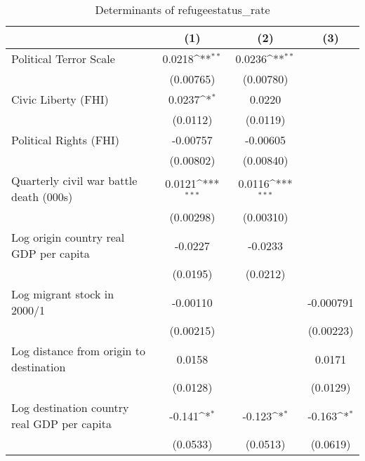 \begin{table}[htbp]\centering
\def\sym#1{\ifmmode^{#1}\else\(^{#1}\)\fi}
\caption{Determinants of refugeestatus\_rate}
\begin{tabular}{l*{3}{c}}
\hline\hline
                    &\multicolumn{1}{c}{(1)}         &\multicolumn{1}{c}{(2)}         &\multicolumn{1}{c}{(3)}         \\
\hline
Political Terror Scale&      0.0218\sym{**} &      0.0236\sym{**} &                     \\
                    &   (0.00765)         &   (0.00780)         &                     \\
[1em]
Civic Liberty (FHI) &      0.0237\sym{*}  &      0.0220         &                     \\
                    &    (0.0112)         &    (0.0119)         &                     \\
[1em]
Political Rights (FHI)&    -0.00757         &    -0.00605         &                     \\
                    &   (0.00802)         &   (0.00840)         &                     \\
[1em]
Quarterly civil war battle death (000s)&      0.0121\sym{***}&      0.0116\sym{***}&                     \\
                    &   (0.00298)         &   (0.00310)         &                     \\
[1em]
Log origin country real GDP per capita&     -0.0227         &     -0.0233         &                     \\
                    &    (0.0195)         &    (0.0212)         &                     \\
[1em]
Log migrant stock in 2000/1&    -0.00110         &                     &   -0.000791         \\
                    &   (0.00215)         &                     &   (0.00223)         \\
[1em]
Log distance from origin to destination&      0.0158         &                     &      0.0171         \\
                    &    (0.0128)         &                     &    (0.0129)         \\
[1em]
Log destination country real GDP per capita&      -0.141\sym{*}  &      -0.123\sym{*}  &      -0.163\sym{*}  \\
                    &    (0.0533)         &    (0.0513)         &    (0.0619)         \\

\end{tabular}
\end{table}
